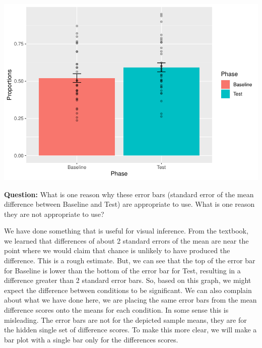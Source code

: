 \documentclass[
]{book}
\begin{document}
\includegraphics{Statistics_Lab_files/figure-latex/unnamed-chunk-179-1.pdf}

\textbf{Question:} What is one reason why these error bars (standard error of the mean difference between Baseline and Test) are appropriate to use. What is one reason they are not appropriate to use?

We have done something that is useful for visual inference. From the textbook, we learned that differences of about 2 standard errors of the mean are near the point where we would claim that chance is unlikely to have produced the difference. This is a rough estimate. But, we can see that the top of the error bar for Baseline is lower than the bottom of the error bar for Test, resulting in a difference greater than 2 standard error bars. So, based on this graph, we might expect the difference between conditions to be significant. We can also complain about what we have done here, we are placing the same error bars from the mean difference scores onto the means for each condition. In some sense this is misleading. The error bars are not for the depicted sample means, they are for the hidden single set of difference scores. To make this more clear, we will make a bar plot with a single bar only for the differences scores.
\end{document}
